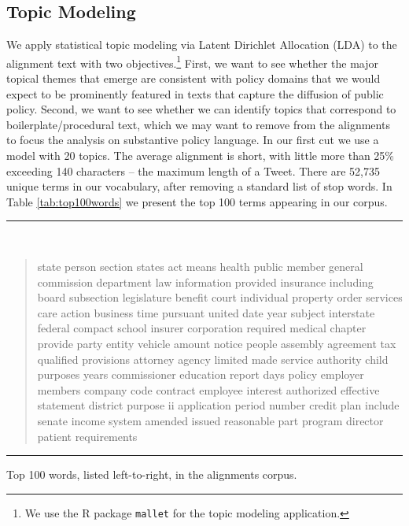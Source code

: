 \documentclass[12pt]{article} %
\begin{document}
\subsection{Topic Modeling}


We apply statistical topic modeling via Latent Dirichlet Allocation (LDA) \citep{blei2003} to the alignment text with two objectives.\footnote{We use the R package \texttt{mallet} \citep{mallet} for the topic modeling application.} First, we want to see whether the major topical themes that emerge are consistent with policy domains that we would expect to be prominently featured in texts that capture the diffusion of public policy. Second, we want to see whether we can identify topics that correspond to boilerplate/procedural text, which we may want to remove from the alignments to focus the analysis on substantive policy language. In our first cut we use a model with 20 topics. The average alignment is short, with little more than 25\% exceeding 140 characters -- the maximum length of a Tweet. There are 52,735 unique terms in our vocabulary, after removing a standard list of stop words. In Table \ref{tab:top100words} we present the top 100 terms appearing in our corpus. 

\begin{table}[ht]
\rule{\textwidth}{1pt} \\ \vspace{-1cm}
\begin{quotation}
\noindent state person section states act means health public member general commission department law information provided insurance including board subsection legislature benefit court individual property order services care action business time pursuant united date year subject interstate federal compact school insurer corporation required medical chapter provide party entity vehicle amount notice people assembly agreement tax qualified provisions attorney agency limited made service authority child purposes years commissioner education report days policy employer members company code contract employee interest authorized effective statement district purpose ii application period number credit plan include senate income system amended issued reasonable part program director patient requirements
\end{quotation} \vspace{-.5cm}
\rule{\textwidth}{1pt} \vspace{-.2cm}
\caption{Top 100 words, listed left-to-right, in the alignments corpus.}
\label{tab:top100words}
\end{table}
\end{document}
